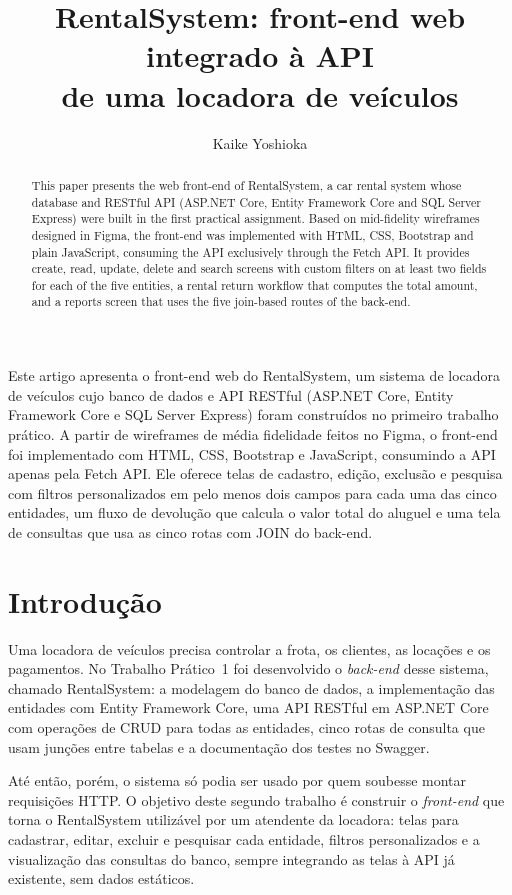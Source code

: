 \documentclass[12pt]{article}
\title{RentalSystem: front-end web integrado à API\\de uma locadora de veículos}
\author{Kaike Yoshioka}
\begin{document}
\maketitle

\begin{abstract}
This paper presents the web front-end of RentalSystem, a car rental system whose database and
RESTful API (ASP.NET Core, Entity Framework Core and SQL Server Express) were built in the first
practical assignment. Based on mid-fidelity wireframes designed in Figma, the front-end was
implemented with HTML, CSS, Bootstrap and plain JavaScript, consuming the API exclusively through
the Fetch API. It provides create, read, update, delete and search screens with custom filters on
at least two fields for each of the five entities, a rental return workflow that computes the total
amount, and a reports screen that uses the five join-based routes of the back-end.
\end{abstract}

\begin{resumo}
Este artigo apresenta o front-end web do RentalSystem, um sistema de locadora de veículos cujo
banco de dados e API RESTful (ASP.NET Core, Entity Framework Core e SQL Server Express) foram
construídos no primeiro trabalho prático. A partir de wireframes de média fidelidade feitos no
Figma, o front-end foi implementado com HTML, CSS, Bootstrap e JavaScript, consumindo a API apenas
pela Fetch API. Ele oferece telas de cadastro, edição, exclusão e pesquisa com filtros
personalizados em pelo menos dois campos para cada uma das cinco entidades, um fluxo de devolução
que calcula o valor total do aluguel e uma tela de consultas que usa as cinco rotas com JOIN do
back-end.
\end{resumo}

\section{Introdução}

Uma locadora de veículos precisa controlar a frota, os clientes, as locações e os pagamentos.
No Trabalho Prático~1 foi desenvolvido o \emph{back-end} desse sistema, chamado RentalSystem:
a modelagem do banco de dados, a implementação das entidades com Entity Framework Core, uma API
RESTful em ASP.NET Core com operações de CRUD para todas as entidades, cinco rotas de consulta que
usam junções entre tabelas e a documentação dos testes no Swagger.

Até então, porém, o sistema só podia ser usado por quem soubesse montar requisições HTTP. O
objetivo deste segundo trabalho é construir o \emph{front-end} que torna o RentalSystem utilizável
por um atendente da locadora: telas para cadastrar, editar, excluir e pesquisar cada entidade,
filtros personalizados e a visualização das consultas do banco, sempre integrando as telas à API
já existente, sem dados estáticos.
\end{document}
